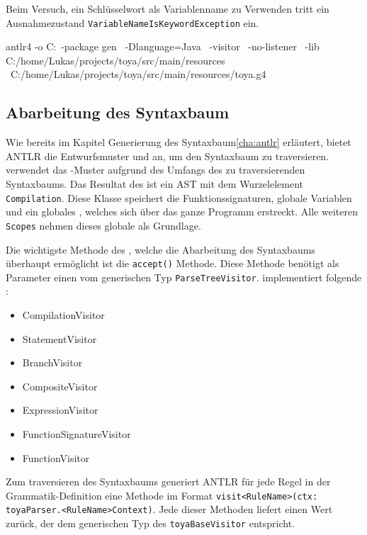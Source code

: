Beim Versuch, ein Schlüsselwort als Variablenname zu Verwenden tritt ein Ausnahmezustand \texttt{VariableNameIsKeywordException} ein. 

\begin{ToyaCode}[numbers=none, caption={Befehl zur Erzeugung der Visitor-Klassen für \toya}]
antlr4 -o C:\home\Lukas\projects\toya\src\main\java\gen \
    -package gen \
    -Dlanguage=Java \
    -visitor \
    -no-listener \
    -lib C:/home/Lukas/projects/toya/src/main/resources \
    C:/home/Lukas/projects/toya/src/main/resources/toya.g4
\end{ToyaCode}

\subsection{Abarbeitung des Syntaxbaum}

Wie bereits im Kapitel Generierung des Syntaxbaum\ref{cha:antlr} erläutert, bietet ANTLR die Entwurfsmuster \visitor und \listener an, um den Syntaxbaum zu traversieren. \Toya verwendet das \visitor-Muster aufgrund des Umfangs des zu traversierenden Syntaxbaums. Das Resultat des \visitors ist ein AST mit dem Wurzelelement \texttt{Compilation}. Diese Klasse speichert die Funktionssignaturen, globale Variablen und ein globales \scope, welches sich über das ganze Programm erstreckt. Alle weiteren \texttt{Scopes} nehmen dieses globale \scope als Grundlage. 

Die wichtigste Methode des \visitor, welche die Abarbeitung des Syntaxbaums überhaupt ermöglicht ist die \texttt{accept()} Methode. Diese Methode benötigt als Parameter einen \visitor vom generischen Typ \texttt{ParseTreeVisitor}. \Toya implementiert folgende \visitor:

\begin{itemize}
    \item CompilationVisitor
    \item StatementVisitor
    \item BranchVisitor
    \item CompositeVisitor
    \item ExpressionVisitor
    \item FunctionSignatureVisitor
    \item FunctionVisitor
\end{itemize}

Zum traversieren des Syntaxbaums generiert ANTLR für jede Regel in der Grammatik-Definition eine Methode im Format \texttt{visit<RuleName>(ctx: toyaParser.<RuleName>Context)}. Jede dieser Methoden liefert einen Wert zurück, der dem generischen Typ des \texttt{toyaBaseVisitor} entspricht.

